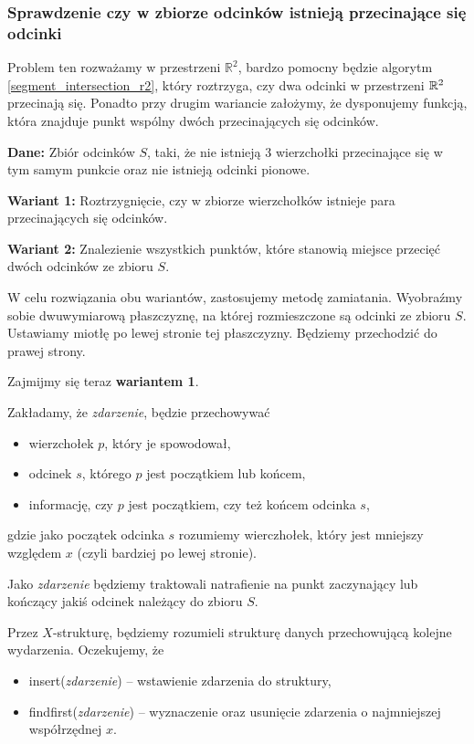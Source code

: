 \subsubsection{Sprawdzenie czy w zbiorze odcinków istnieją przecinające się odcinki}
Problem ten rozważamy w przestrzeni $\mathbb{R}^2$, bardzo pomocny będzie 
algorytm \ref{segment_intersection_r2}, który roztrzyga, czy dwa odcinki
w przestrzeni $\mathbb{R}^2$ przecinają się. Ponadto przy drugim wariancie założymy,
że dysponujemy funkcją, która znajduje punkt wspólny dwóch 
przecinających się odcinków. 

\textbf{Dane:} Zbiór odcinków $S$, taki, że nie istnieją 3 wierzchołki przecinające
się w tym samym punkcie oraz nie istnieją odcinki pionowe.

\textbf{Wariant 1:} Roztrzygnięcie, czy w zbiorze wierzchołków istnieje 
para przecinających się odcinków.

\textbf{Wariant 2:} Znalezienie wszystkich punktów, które 
stanowią miejsce przecięć dwóch odcinków ze zbioru $S$.

W celu rozwiązania obu wariantów, zastosujemy metodę zamiatania. Wyobraźmy
sobie dwuwymiarową płaszczyznę, na której rozmieszczone są odcinki ze zbioru $S$.
Ustawiamy miotłę po lewej stronie tej płaszczyzny. Będziemy przechodzić do prawej strony.

Zajmijmy się teraz \textbf{wariantem 1}.

Zakładamy, że \textit{zdarzenie}, będzie przechowywać 
\begin{itemize}
	\item wierzchołek $p$, który je spowodował, 
	\item odcinek $s$, którego $p$ jest początkiem lub końcem,
	\item informację, czy $p$ jest początkiem, czy też końcem odcinka $s$,
\end{itemize}
gdzie jako początek odcinka $s$ rozumiemy wierczhołek, który jest 
mniejszy względem $x$ (czyli bardziej po lewej stronie).

Jako \textit{zdarzenie} będziemy traktowali natrafienie na punkt zaczynający 
lub kończący jakiś odcinek należący do zbioru $S$.

Przez $X$-strukturę, będziemy rozumieli strukturę danych przechowującą 
kolejne wydarzenia. Oczekujemy, że 
\begin{itemize}
	\item insert(\textit{zdarzenie})  -- wstawienie zdarzenia do struktury,
	\item findfirst(\textit{zdarzenie})  -- wyznaczenie oraz usunięcie zdarzenia
	o najmniejszej współrzędnej $x$.
\end{itemize}

